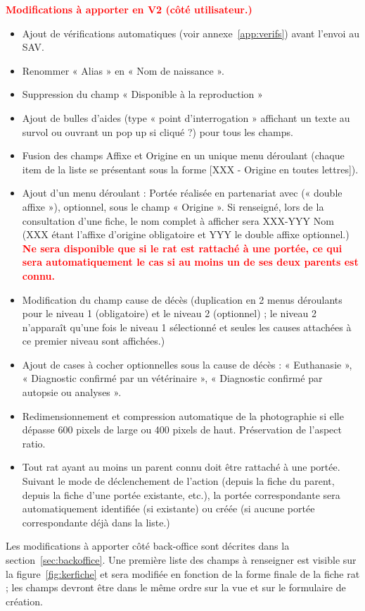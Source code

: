 ﻿\documentclass[a4paper,10pt]{article}
\newcommand\desire[1]{\noindent\textbf{\textcolor{red}{#1}}}
\begin{document}
\noindent\desire{Modifications à apporter en V2 (côté utilisateur.)}
\begin{itemize}
\item Ajout de vérifications automatiques (voir annexe~\ref{app:verifs}) avant l'envoi au SAV.
\item Renommer « Alias » en « Nom de naissance ».
\item Suppression du champ « Disponible à la reproduction »
\item Ajout de bulles d'aides (type « point d'interrogation » affichant un texte au survol ou ouvrant un pop up si cliqué ?) pour tous les champs.
\item Fusion des champs Affixe et Origine en un unique menu déroulant (chaque item de la liste se présentant sous la forme [XXX - Origine en toutes lettres]).
\item Ajout d'un menu déroulant : Portée réalisée en partenariat avec (« double affixe »), optionnel, sous le champ « Origine ». Si renseigné, lors de la consultation d'une fiche, le nom complet à afficher sera XXX-YYY Nom (XXX étant l'affixe d'origine obligatoire et YYY le double affixe optionnel.) \desire{Ne sera disponible que si le rat est rattaché à une portée, ce qui sera automatiquement le cas si au moins un de ses deux parents est connu.}
\item Modification du champ cause de décès (duplication en 2 menus déroulants pour le niveau 1 (obligatoire) et le niveau 2 (optionnel) ; le niveau 2 n'apparaît qu'une fois le niveau 1 sélectionné et seules les causes attachées à ce premier niveau sont affichées.)
\item Ajout de cases à cocher optionnelles sous la cause de décès : « Euthanasie », « Diagnostic confirmé par un vétérinaire », « Diagnostic confirmé par autopsie ou analyses ».       
\item Redimensionnement et compression automatique de la photographie si elle dépasse 600 pixels de large ou 400 pixels de haut. Préservation de l'aspect ratio. 
\item Tout rat ayant au moins un parent connu doit être rattaché à une portée. Suivant le mode de déclenchement de l'action (depuis la fiche du parent, depuis la fiche d'une portée existante, etc.), la portée correspondante sera automatiquement identifiée (si existante) ou créée (si aucune portée correspondante déjà dans la liste.)
\end{itemize}

Les modifications à apporter côté back-office sont décrites dans la section~\ref{sec:backoffice}. Une première liste des champs à renseigner est visible sur la figure~\ref{fig:kerfiche} et sera modifiée en fonction de la forme finale de la fiche rat ; les champs devront être dans le même ordre sur la vue et sur le formulaire de création.    
\end{document}
